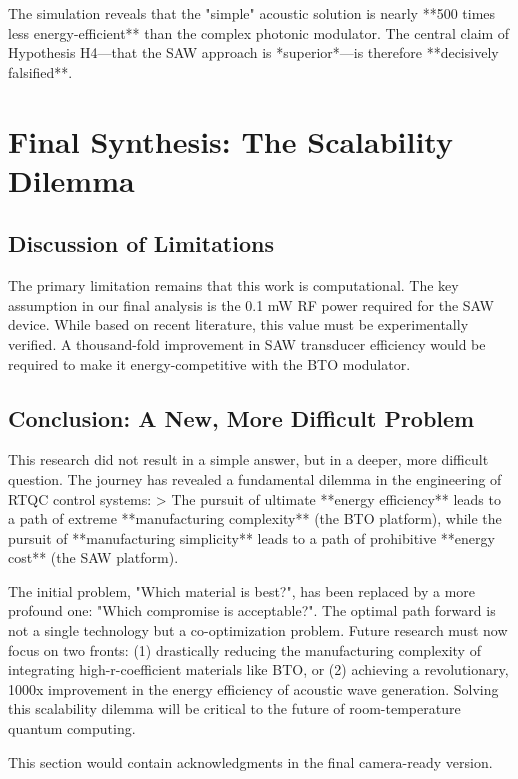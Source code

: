 \documentclass{article}
\begin{document}
The simulation reveals that the "simple" acoustic solution is nearly **500 times less energy-efficient** than the complex photonic modulator. The central claim of Hypothesis H4—that the SAW approach is *superior*—is therefore **decisively falsified**.

\section{Final Synthesis: The Scalability Dilemma}
\subsection{Discussion of Limitations}
The primary limitation remains that this work is computational. The key assumption in our final analysis is the 0.1 mW RF power required for the SAW device. While based on recent literature, this value must be experimentally verified. A thousand-fold improvement in SAW transducer efficiency would be required to make it energy-competitive with the BTO modulator.

\subsection{Conclusion: A New, More Difficult Problem}
This research did not result in a simple answer, but in a deeper, more difficult question. The journey has revealed a fundamental dilemma in the engineering of RTQC control systems:
> The pursuit of ultimate **energy efficiency** leads to a path of extreme **manufacturing complexity** (the BTO platform), while the pursuit of **manufacturing simplicity** leads to a path of prohibitive **energy cost** (the SAW platform).

The initial problem, "Which material is best?", has been replaced by a more profound one: "Which compromise is acceptable?". The optimal path forward is not a single technology but a co-optimization problem. Future research must now focus on two fronts: (1) drastically reducing the manufacturing complexity of integrating high-r-coefficient materials like BTO, or (2) achieving a revolutionary, 1000x improvement in the energy efficiency of acoustic wave generation. Solving this scalability dilemma will be critical to the future of room-temperature quantum computing.

\begin{ack}
This section would contain acknowledgments in the final camera-ready version.
\end{ack}
\end{document}
